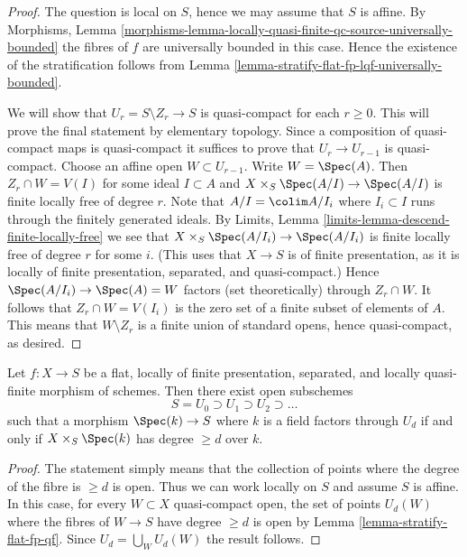 \begin{proof}
The question is local on $S$, hence we may assume that $S$ is affine.
By Morphisms, Lemma
\ref{morphisms-lemma-locally-quasi-finite-qc-source-universally-bounded}
the fibres of $f$ are universally bounded in this case.
Hence the existence of the stratification follows from
Lemma \ref{lemma-stratify-flat-fp-lqf-universally-bounded}.

\medskip\noindent
We will show that $U_r = S \setminus Z_r \to S$ is quasi-compact for
each $r \geq 0$. This will prove the final statement by elementary topology.
Since a composition of quasi-compact maps is quasi-compact
it suffices to prove that $U_r \to U_{r - 1}$ is quasi-compact.
Choose an affine open $W \subset U_{r - 1}$. Write $W = \Spec(A)$.
Then $Z_r \cap W = V(I)$ for some ideal $I \subset A$
and $X \times_S \Spec(A/I) \to \Spec(A/I)$ is finite locally
free of degree $r$. Note that $A/I = \colim A/I_i$ where $I_i \subset I$
runs through the finitely generated ideals. By
Limits, Lemma \ref{limits-lemma-descend-finite-locally-free}
we see that $X \times_S \Spec(A/I_i) \to \Spec(A/I_i)$
is finite locally free of degree $r$ for some $i$. (This uses
that $X \to S$ is of finite presentation, as it is locally of finite
presentation, separated, and quasi-compact.)
Hence $\Spec(A/I_i) \to \Spec(A) = W$ factors (set theoretically)
through $Z_r \cap W$. It follows that $Z_r \cap W = V(I_i)$ is the zero
set of a finite subset of elements of $A$. This means that
$W \setminus Z_r$ is a finite union of standard opens, hence quasi-compact,
as desired.
\end{proof}

\begin{lemma}
\label{lemma-stratify-flat-fp-lqf}
Let $f : X \to S$ be a flat, locally of finite presentation, separated, and
locally quasi-finite morphism of schemes. Then there
exist open subschemes
$$
S = U_0 \supset U_1 \supset U_2 \supset \ldots
$$
such that a morphism $\Spec(k) \to S$ where $k$ is a field
factors through $U_d$ if and
only if $X \times_S \Spec(k)$ has degree $\geq d$ over $k$.
\end{lemma}

\begin{proof}
The statement simply means that the collection of points where the degree
of the fibre is $\geq d$ is open. Thus we can work locally on $S$ and
assume $S$ is affine. In this case, for every $W \subset X$ quasi-compact
open, the set of points $U_d(W)$ where the fibres of $W \to S$ have
degree $\geq d$ is open by Lemma \ref{lemma-stratify-flat-fp-qf}.
Since $U_d = \bigcup_W U_d(W)$ the result follows.
\end{proof}

